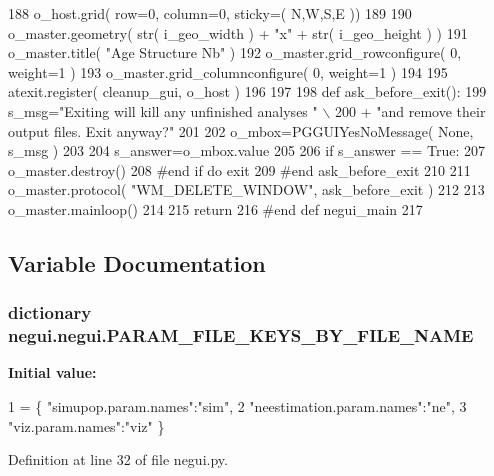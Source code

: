 \begin{DoxyCode}
188     o\_host.grid( row=0, column=0, sticky=( N,W,S,E ))
189 
190     o\_master.geometry( str(  i\_geo\_width ) + \textcolor{stringliteral}{"x"} + str( i\_geo\_height ) )
191     o\_master.title( \textcolor{stringliteral}{"Age Structure Nb"} )    
192     o\_master.grid\_rowconfigure( 0, weight=1 )
193     o\_master.grid\_columnconfigure( 0, weight=1 )
194 
195     atexit.register( cleanup\_gui, o\_host )
196 
197 
198     \textcolor{keyword}{def }ask\_before\_exit():
199         s\_msg=\textcolor{stringliteral}{"Exiting will kill any unfinished analyses "} \(\backslash\)
200                 + \textcolor{stringliteral}{"and remove their output files.  Exit anyway?"}
201 
202         o\_mbox=PGGUIYesNoMessage( \textcolor{keywordtype}{None}, s\_msg )
203 
204         s\_answer=o\_mbox.value
205 
206         \textcolor{keywordflow}{if} s\_answer == \textcolor{keyword}{True}:
207             o\_master.destroy()
208         \textcolor{comment}{#end if do exit}
209     \textcolor{comment}{#end ask\_before\_exit}
210     
211     o\_master.protocol( \textcolor{stringliteral}{"WM\_DELETE\_WINDOW"}, ask\_before\_exit )
212 
213     o\_master.mainloop()
214 
215     \textcolor{keywordflow}{return}
216 \textcolor{comment}{#end def negui\_main}
217 
\end{DoxyCode}


\subsection{Variable Documentation}
\subsubsection[{\texorpdfstring{P\+A\+R\+A\+M\+\_\+\+F\+I\+L\+E\+\_\+\+K\+E\+Y\+S\+\_\+\+B\+Y\+\_\+\+F\+I\+L\+E\+\_\+\+N\+A\+ME}{PARAM_FILE_KEYS_BY_FILE_NAME}}]{\setlength{\rightskip}{0pt plus 5cm}dictionary negui.\+negui.\+P\+A\+R\+A\+M\+\_\+\+F\+I\+L\+E\+\_\+\+K\+E\+Y\+S\+\_\+\+B\+Y\+\_\+\+F\+I\+L\+E\+\_\+\+N\+A\+ME}\hypertarget{namespacenegui_1_1negui_aaf04079b95df479b9db4dd490352430c}{}\label{namespacenegui_1_1negui_aaf04079b95df479b9db4dd490352430c}
{\bfseries Initial value\+:}
\begin{DoxyCode}
1 = \{ \textcolor{stringliteral}{"simupop.param.names"}:\textcolor{stringliteral}{"sim"}, 
2                                     \textcolor{stringliteral}{"neestimation.param.names"}:\textcolor{stringliteral}{"ne"}, 
3                                         \textcolor{stringliteral}{"viz.param.names"}:\textcolor{stringliteral}{"viz"} \}
\end{DoxyCode}


Definition at line 32 of file negui.\+py.

